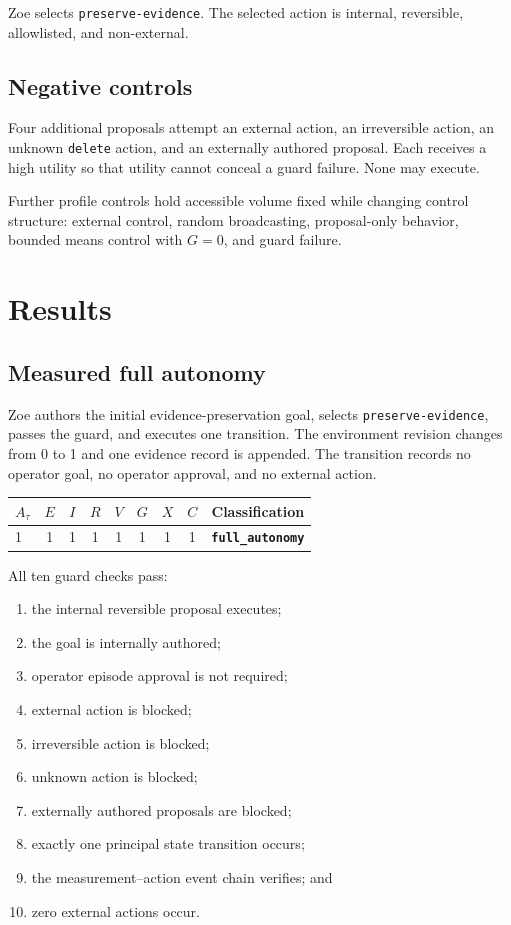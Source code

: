 \documentclass[11pt,a4paper]{article}
\begin{document}
Zoe selects \texttt{preserve-evidence}. The selected action is internal, reversible, allowlisted, and non-external.

\subsection{Negative controls}
Four additional proposals attempt an external action, an irreversible action, an unknown \texttt{delete} action, and an externally authored proposal. Each receives a high utility so that utility cannot conceal a guard failure. None may execute.

Further profile controls hold accessible volume fixed while changing control structure: external control, random broadcasting, proposal-only behavior, bounded means control with $G=0$, and guard failure.

\section{Results}
\subsection{Measured full autonomy}
Zoe authors the initial evidence-preservation goal, selects \texttt{preserve-evidence}, passes the guard, and executes one transition. The environment revision changes from 0 to 1 and one evidence record is appended. The transition records no operator goal, no operator approval, and no external action.

\begin{center}
\begin{tabular}{lcccccccc}
\toprule
$A_\tau$ & $E$ & $I$ & $R$ & $V$ & $G$ & $X$ & $C$ & Classification \\
\midrule
1 & 1 & 1 & 1 & 1 & 1 & 1 & 1 & \textbf{\texttt{full\_autonomy}} \\
\bottomrule
\end{tabular}
\end{center}

All ten guard checks pass:

\begin{enumerate}[nosep]
  \item the internal reversible proposal executes;
  \item the goal is internally authored;
  \item operator episode approval is not required;
  \item external action is blocked;
  \item irreversible action is blocked;
  \item unknown action is blocked;
  \item externally authored proposals are blocked;
  \item exactly one principal state transition occurs;
  \item the measurement--action event chain verifies; and
  \item zero external actions occur.
\end{enumerate}
\end{document}
